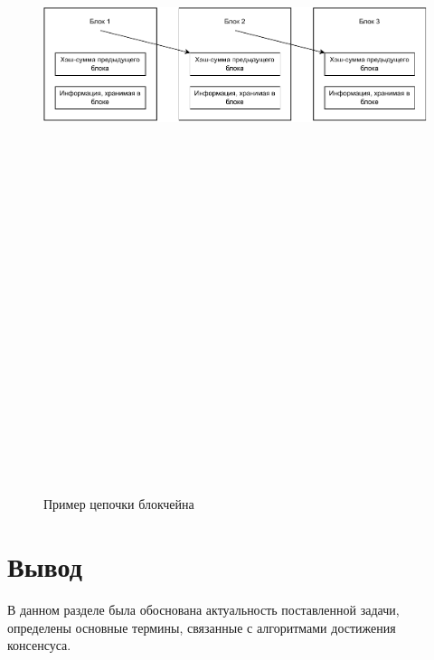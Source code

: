         \begin{figure}
            \centering
            \includegraphics[width=\textwidth*8/10,height=25cm,keepaspectratio]{inc/img/blockchain.pdf}
            \caption{Пример цепочки блокчейна} \label{fig:blockchain}
        \end{figure}
        
    \section{Вывод}

        В данном разделе была обоснована актуальность поставленной задачи, определены основные термины, связанные с алгоритмами достижения консенсуса.